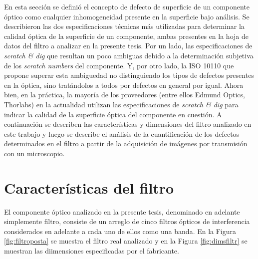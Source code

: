 \begin{tcolorbox}
 En esta sección se definió el concepto de defecto de superficie de un componente óptico como cualquier inhomogeneidad presente en la superficie bajo análisis. Se describieron las dos especificaciones técnicas más utilizadas para determinar la calidad óptica de la superficie de un componente, ambas presentes en la hoja de datos del filtro a analizar en la presente tesis. Por un lado, las especificaciones de \textit{scratch \& dig} que resultan un poco ambiguas debido a la determinación subjetiva de los \textit{scratch numbers} del componente. Y, por otro lado, la ISO 10110 que propone superar esta ambiguedad no distinguiendo los tipos de defectos presentes en la óptica, sino tratándolos a todos por defectos en general por igual. Ahora bien, en la práctica, la mayoría de los proveedores (entre ellos Edmund Optics, Thorlabs) en la actualidad utilizan las especificaciones de \textit{scratch \& dig} para indicar la calidad de la superficie óptica del componente en cuestión. A continuación se describen las características y dimensiones del filtro analizado en este trabajo y luego se describe el análisis de la cuantificación de los defectos determinados en el filtro a partir de la adquisición de imágenes por transmisión con un microscopio.
\end{tcolorbox}




\singlespacing
\section*{Características del filtro}

\vspace{1cm}
\vspace{1cm}

\hspace{0.5cm}El componente óptico analizado en la presente tesis, denominado en adelante simplemente filtro, consiste de un arreglo de cinco filtros ópticos de interferencia \todo{si hace falta explicar un poco en qu[e consisten este tipo de filtros..}    considerados en adelante a cada uno de ellos como una banda. En la Figura \ref{fig:filtroposta} se muestra el filtro real analizado y en la Figura \ref{fig:dimsfiltr} se muestran las diimensiones especificadas por el fabricante.

